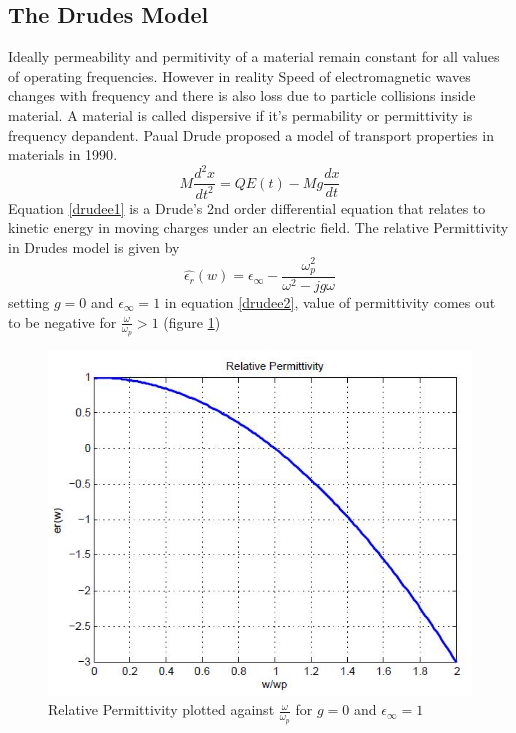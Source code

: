 \subsection{The Drudes Model}
Ideally permeability and permitivity of a material remain constant for all values of operating frequencies. However in reality Speed of electromagnetic waves changes with frequency and there is also loss due to particle collisions inside material. A material is called dispersive if it's permability or permittivity is frequency depandent.
Paual Drude proposed a model of transport properties in materials in 1990\citep{drude}.
\begin{equation}
	M\frac{d^2x}{dt^2} = QE(t) - Mg\frac{dx}{dt}
\label{drudee1}
\end{equation}
Equation \eqref{drudee1} is a Drude's 2nd order differential equation that relates to kinetic energy in moving charges under an electric field. The relative Permittivity in Drudes model is given by 
\begin{equation}
\hat{\epsilon_r} (w) = \epsilon_{\infty}- \frac{\omega_p^2}{\omega^2 - jg\omega}
\label{drudee2}
\end{equation}
setting $g=0$ and $ \epsilon_{\infty} = 1$ in equation \eqref{drudee2}, value of permittivity comes out to be negative for $\frac{\omega}{\omega_p} > 1$ (figure \ref{drude1})
\begin{figure}[htbp]
	\centering
		\includegraphics[width=5in]{Figures/drude1.jpg}
	\caption[Permittivity in Drudes model for different frequencies]{Relative Permittivity plotted against $\frac{\omega}{\omega_p}$ for $g=0$ and $ \epsilon_{\infty} = 1$ }
	\label{drude1}
\end{figure}

